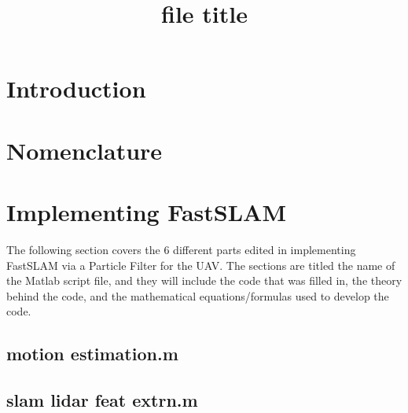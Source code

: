 \documentclass{rapport}
\title{file title} %
\begin{document}

\subject{EE5114: Autonomous Robot Navigation} %



        
\buildmargins %
\buildcover %


\section{Introduction}
\label{Introduction}



\section{Nomenclature}
\label{Nomenclature}


\pagebreak
\section{Implementing FastSLAM}
\label{Motion_estimation}
The following section covers the 6 different parts edited in implementing FastSLAM via a Particle Filter for the UAV. The sections are titled the name of the Matlab script file, and they will include the code that was filled in, the theory behind the code, and the mathematical equations/formulas used to develop the code.
\subsection{motion estimation.m}


\subsection{slam lidar feat extrn.m}

\end{document}
